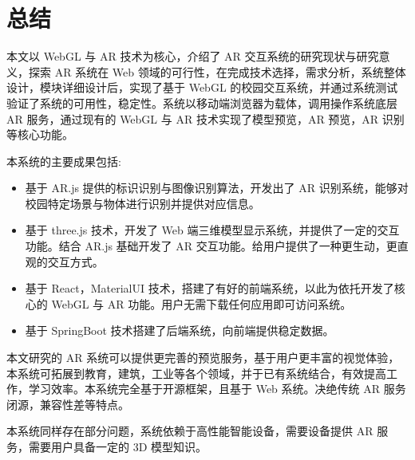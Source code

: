 \section{总结}

本文以 WebGL 与 AR 技术为核心，介绍了 AR 交互系统的研究现状与研究意义，探索 AR 系统在 Web 领域的可行性，在完成技术选择，需求分析，系统整体设计，模块详细设计后，实现了基于 WebGL 的校园交互系统，并通过系统测试验证了系统的可用性，稳定性。系统以移动端浏览器为载体，调用操作系统底层 AR 服务，通过现有的 WebGL 与 AR 技术实现了模型预览，AR 预览，AR 识别等核心功能。

本系统的主要成果包括:
\begin{itemize}
  \item 基于 AR.js 提供的标识识别与图像识别算法，开发出了 AR 识别系统，能够对校园特定场景与物体进行识别并提供对应信息。
  \item 基于 three.js 技术，开发了 Web 端三维模型显示系统，并提供了一定的交互功能。结合 AR.js 基础开发了 AR 交互功能。给用户提供了一种更生动，更直观的交互方式。
  \item 基于 React，MaterialUI 技术，搭建了有好的前端系统，以此为依托开发了核心的 WebGL 与 AR 功能。用户无需下载任何应用即可访问系统。
  \item 基于 SpringBoot 技术搭建了后端系统，向前端提供稳定数据。
\end{itemize}

本文研究的 AR 系统可以提供更完善的预览服务，基于用户更丰富的视觉体验，本系统可拓展到教育，建筑，工业等各个领域，并于已有系统结合，有效提高工作，学习效率。本系统完全基于开源框架，且基于 Web 系统。决绝传统 AR 服务闭源，兼容性差等特点。

本系统同样存在部分问题，系统依赖于高性能智能设备，需要设备提供 AR 服务，需要用户具备一定的 3D 模型知识。